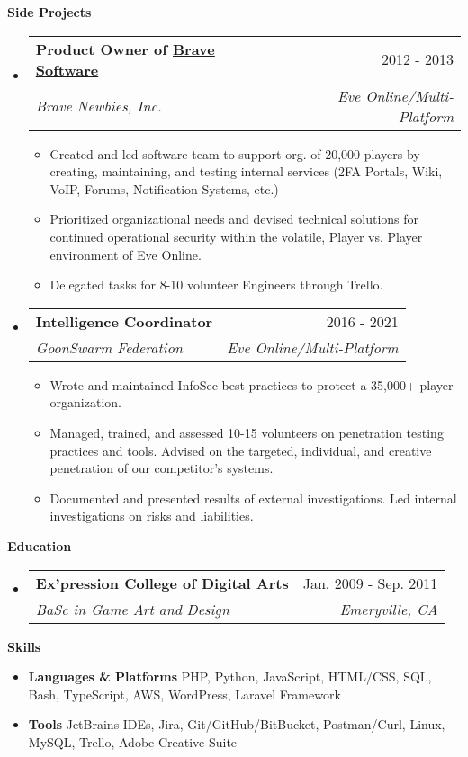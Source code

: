 \documentclass[letterpaper,10pt]{article}[leftmargin=*]
\makeatletter
\def \entryspacing {-0pt}
\renewcommand{\section}[2]{\vspace{5pt}
  \colorbox{secondary}{\color{white}\raggedbottom\normalsize\textbf{{#1}{\hspace{7pt}#2}}}
}
\newcommand{\resumeEntryStart}{\begin{itemize}[leftmargin=2.5mm]}
\newcommand{\resumeEntryEnd}{\end{itemize}\vspace{\entryspacing}}
\newcommand{\resumeItemListStart}{\begin{itemize}[leftmargin=4.5mm]}
\newcommand{\resumeItemListEnd}{\end{itemize}}
\newcommand{\resumeItem}[1]{
  \item\small{
    {#1 \vspace{-2pt}}
  }
}
\newcommand{\resumeEntryTSDL}[4]{
  \vspace{-1pt}\item[]
    \begin{tabularx}{0.97\textwidth}{X@{\hspace{60pt}}r}
      \textbf{\color{primary}#1} & {\firabook\color{accent}\small#2} \\
      \textit{\color{accent}\small#3} & \textit{\color{accent}\small#4} \\
    \end{tabularx}\vspace{-6pt}
}
\newcommand{\resumeEntryS}[2]{
  \item[]\small{
    \textbf{\color{primary}#1 }{ #2 \vspace{-6pt}}
  }
}
\makeatother
\begin{document}
\section{\faFlask}{Side Projects}

  \resumeEntryStart
    \resumeEntryTSDL
      {Product Owner of \href{https://github.com/bravecollective}{Brave Software} }{2012 - 2013}
      {Brave Newbies, Inc.}{Eve Online/Multi-Platform}
    \resumeItemListStart
      \resumeItem {Created and led software team to support org. of 20,000 players by creating, maintaining, and testing internal services (2FA Portals, Wiki, VoIP, Forums, Notification Systems, etc.)}
      \resumeItem {Prioritized organizational needs and devised technical solutions for continued operational security within the volatile, Player vs. Player environment of Eve Online.}
      \resumeItem {Delegated tasks for 8-10 volunteer Engineers through Trello.}
    \resumeItemListEnd
  \resumeEntryEnd

  \resumeEntryStart
    \resumeEntryTSDL
      {Intelligence Coordinator}{2016 - 2021}
      {GoonSwarm Federation}{Eve Online/Multi-Platform}
    \resumeItemListStart
      \resumeItem {Wrote and maintained InfoSec best practices to protect a 35,000+ player organization. }
      \resumeItem {Managed, trained, and assessed 10-15 volunteers on penetration testing practices and tools. Advised on the targeted, individual, and creative penetration of our competitor's systems. }
      \resumeItem{Documented and presented results of external investigations. Led internal investigations on risks and liabilities. }
    \resumeItemListEnd
  \resumeEntryEnd

\section{\faGraduationCap}{Education}

  \resumeEntryStart
    \resumeEntryTSDL
      {Ex’pression College of Digital Arts}{Jan. 2009 - Sep. 2011}
      {BaSc in Game Art and Design}{Emeryville, CA}
  \resumeEntryEnd

\section{\faGears}{Skills}
 \resumeEntryStart
  \resumeEntryS{Languages \& Platforms} { PHP, Python, JavaScript, HTML/CSS, SQL, Bash, TypeScript, AWS, WordPress, Laravel Framework}
  \resumeEntryS{Tools } {JetBrains IDEs, Jira, Git/GitHub/BitBucket, Postman/Curl, Linux, MySQL, Trello, Adobe Creative Suite}
 \resumeEntryEnd
\end{document}
